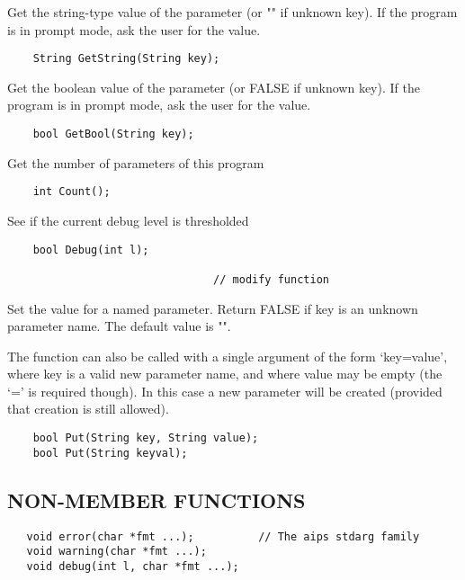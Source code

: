        Get the string-type value of the parameter (or "" if unknown key).
       If the program is in prompt mode, ask the user for the value.
\begin{verbatim}
    String GetString(String key);
\end{verbatim}

       Get the boolean value of the parameter (or FALSE if unknown key).
       If the program is in prompt mode, ask the user for the value.
\begin{verbatim}
    bool GetBool(String key);
\end{verbatim}

       Get the number of parameters of this program
\begin{verbatim}
    int Count();
\end{verbatim}

       See if the current debug level is thresholded
\begin{verbatim}
    bool Debug(int l);

                                // modify function
\end{verbatim}

       Set the value for a named parameter.
       Return FALSE if key is an unknown parameter name.
       The default value is "".
      
       The function can also be called with a single argument of the
       form `key=value', where key is a valid new parameter name, and
       where value may be empty (the `=' is required though). In this 
       case a new parameter will be created (provided that creation is 
       still allowed).
\begin{verbatim}
    bool Put(String key, String value);
    bool Put(String keyval);
\end{verbatim}

\subsection*{NON-MEMBER FUNCTIONS}

\begin{verbatim}
   void error(char *fmt ...);          // The aips stdarg family
   void warning(char *fmt ...);
   void debug(int l, char *fmt ...);
\end{verbatim}
